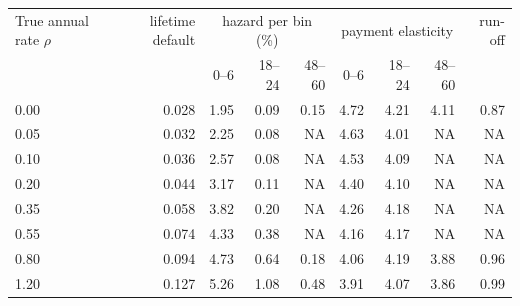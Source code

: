 \begin{tabular}{lrrrrrrrr}
\toprule
True annual rate $\rho$ & lifetime default & \multicolumn{3}{c}{hazard per bin (\%)} & \multicolumn{3}{c}{payment elasticity} & run-off \\
 & & 0--6 & 18--24 & 48--60 & 0--6 & 18--24 & 48--60 & \\
\midrule
0.00 & 0.028 & 1.95 & 0.09 & 0.15 & 4.72 & 4.21 & 4.11 & 0.87 \\
0.05 & 0.032 & 2.25 & 0.08 & NA & 4.63 & 4.01 & NA & NA \\
0.10 & 0.036 & 2.57 & 0.08 & NA & 4.53 & 4.09 & NA & NA \\
0.20 & 0.044 & 3.17 & 0.11 & NA & 4.40 & 4.10 & NA & NA \\
0.35 & 0.058 & 3.82 & 0.20 & NA & 4.26 & 4.18 & NA & NA \\
0.55 & 0.074 & 4.33 & 0.38 & NA & 4.16 & 4.17 & NA & NA \\
0.80 & 0.094 & 4.73 & 0.64 & 0.18 & 4.06 & 4.19 & 3.88 & 0.96 \\
1.20 & 0.127 & 5.26 & 1.08 & 0.48 & 3.91 & 4.07 & 3.86 & 0.99 \\
\bottomrule
\end{tabular}
